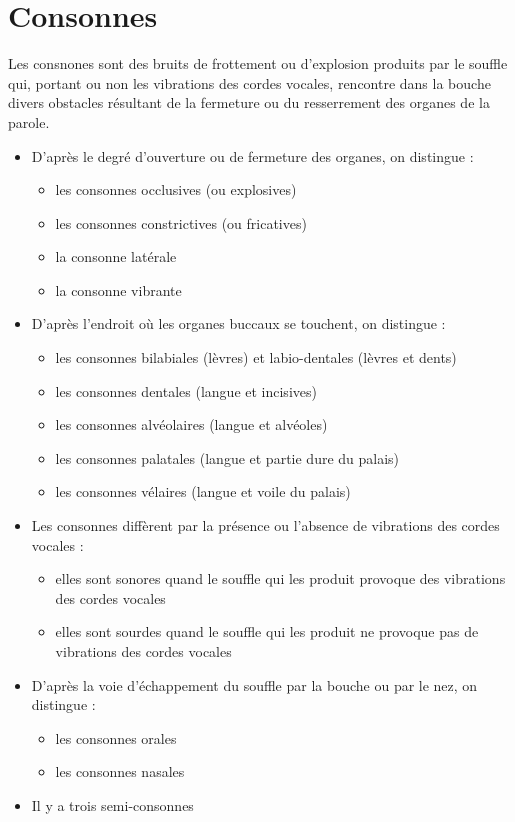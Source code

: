 \chapter{Consonnes}\label{chap:cons}

Les consnones sont des bruits de frottement ou d'explosion produits
par le souffle qui, portant ou non les vibrations des cordes vocales,
rencontre dans la bouche divers obstacles résultant de la fermeture ou
du resserrement des organes de la parole.
\newpage
\minitoc
\newpage

\begin{itemize}
\item D'après le degré d'ouverture ou de fermeture des organes, on
  distingue :
  \begin{itemize}
  \item les consonnes occlusives (ou explosives)
  \item les consonnes constrictives (ou fricatives)
  \item la consonne latérale
  \item la consonne vibrante
  \end{itemize}
\item D'après l'endroit où les organes buccaux se touchent, on
  distingue :
  \begin{itemize}
  \item les consonnes bilabiales (lèvres) et labio-dentales (lèvres et
    dents)
  \item les consonnes dentales (langue et incisives)
  \item les consonnes alvéolaires (langue et alvéoles)
  \item les consonnes palatales (langue et partie dure du palais)
  \item les consonnes vélaires (langue et voile du palais)
  \end{itemize}
\item Les consonnes diffèrent par la présence ou l'absence de
  vibrations des cordes vocales :
  \begin{itemize}
  \item elles sont sonores quand le souffle qui les produit provoque
    des vibrations des cordes vocales
  \item elles sont sourdes quand le souffle qui les produit ne
    provoque pas de vibrations des cordes vocales 
  \end{itemize}
\item D'après la voie d'échappement du souffle par la bouche ou par le
  nez, on distingue :
  \begin{itemize}
  \item les consonnes orales
  \item les consonnes nasales
  \end{itemize}
\item Il y a trois semi-consonnes  
\end{itemize}

